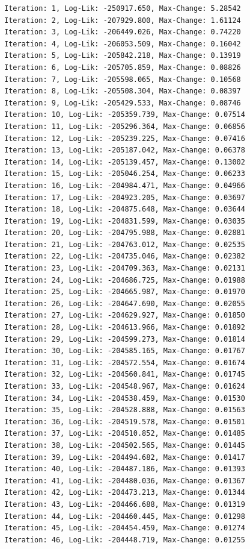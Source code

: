 \documentclass[
  letterpaper,
  DIV=11,
  numbers=noendperiod]{scrreport}
\begin{document}
\begin{verbatim}
Iteration: 1, Log-Lik: -250917.650, Max-Change: 5.28542
Iteration: 2, Log-Lik: -207929.800, Max-Change: 1.61124
Iteration: 3, Log-Lik: -206449.026, Max-Change: 0.74220
Iteration: 4, Log-Lik: -206053.509, Max-Change: 0.16042
Iteration: 5, Log-Lik: -205842.218, Max-Change: 0.13919
Iteration: 6, Log-Lik: -205705.859, Max-Change: 0.08826
Iteration: 7, Log-Lik: -205598.065, Max-Change: 0.10568
Iteration: 8, Log-Lik: -205508.304, Max-Change: 0.08397
Iteration: 9, Log-Lik: -205429.533, Max-Change: 0.08746
Iteration: 10, Log-Lik: -205359.739, Max-Change: 0.07514
Iteration: 11, Log-Lik: -205296.364, Max-Change: 0.06856
Iteration: 12, Log-Lik: -205239.225, Max-Change: 0.07416
Iteration: 13, Log-Lik: -205187.042, Max-Change: 0.06378
Iteration: 14, Log-Lik: -205139.457, Max-Change: 0.13002
Iteration: 15, Log-Lik: -205046.254, Max-Change: 0.06233
Iteration: 16, Log-Lik: -204984.471, Max-Change: 0.04966
Iteration: 17, Log-Lik: -204923.205, Max-Change: 0.03697
Iteration: 18, Log-Lik: -204875.648, Max-Change: 0.03644
Iteration: 19, Log-Lik: -204831.599, Max-Change: 0.03035
Iteration: 20, Log-Lik: -204795.988, Max-Change: 0.02881
Iteration: 21, Log-Lik: -204763.012, Max-Change: 0.02535
Iteration: 22, Log-Lik: -204735.046, Max-Change: 0.02382
Iteration: 23, Log-Lik: -204709.363, Max-Change: 0.02131
Iteration: 24, Log-Lik: -204686.725, Max-Change: 0.01988
Iteration: 25, Log-Lik: -204665.987, Max-Change: 0.01970
Iteration: 26, Log-Lik: -204647.690, Max-Change: 0.02055
Iteration: 27, Log-Lik: -204629.927, Max-Change: 0.01850
Iteration: 28, Log-Lik: -204613.966, Max-Change: 0.01892
Iteration: 29, Log-Lik: -204599.273, Max-Change: 0.01814
Iteration: 30, Log-Lik: -204585.165, Max-Change: 0.01767
Iteration: 31, Log-Lik: -204572.554, Max-Change: 0.01674
Iteration: 32, Log-Lik: -204560.841, Max-Change: 0.01745
Iteration: 33, Log-Lik: -204548.967, Max-Change: 0.01624
Iteration: 34, Log-Lik: -204538.459, Max-Change: 0.01530
Iteration: 35, Log-Lik: -204528.888, Max-Change: 0.01563
Iteration: 36, Log-Lik: -204519.578, Max-Change: 0.01501
Iteration: 37, Log-Lik: -204510.852, Max-Change: 0.01485
Iteration: 38, Log-Lik: -204502.565, Max-Change: 0.01445
Iteration: 39, Log-Lik: -204494.682, Max-Change: 0.01417
Iteration: 40, Log-Lik: -204487.186, Max-Change: 0.01393
Iteration: 41, Log-Lik: -204480.036, Max-Change: 0.01367
Iteration: 42, Log-Lik: -204473.213, Max-Change: 0.01344
Iteration: 43, Log-Lik: -204466.688, Max-Change: 0.01319
Iteration: 44, Log-Lik: -204460.445, Max-Change: 0.01298
Iteration: 45, Log-Lik: -204454.459, Max-Change: 0.01274
Iteration: 46, Log-Lik: -204448.719, Max-Change: 0.01255

\end{verbatim}
\end{document}
